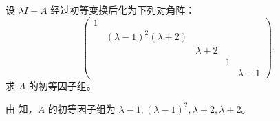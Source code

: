 \documentclass[../../main.tex]{subfiles}%
\begin{document}
\begin{example}
设 $\lambda I - A$ 经过初等变换后化为下列对角阵：
\[
\begin{pmatrix}
1 & & & & \\
& (\lambda - 1)^2(\lambda + 2) & & & \\
& & \lambda + 2 & & \\
& & & 1 & \\
& & & & \lambda - 1
\end{pmatrix},
\]
求 $A$ 的初等因子组。
\end{example}
\begin{solution}
由 知，$A$ 的初等因子组为 $\lambda - 1,(\lambda - 1)^2,\lambda + 2,\lambda + 2$。

\end{solution}
\end{document}
